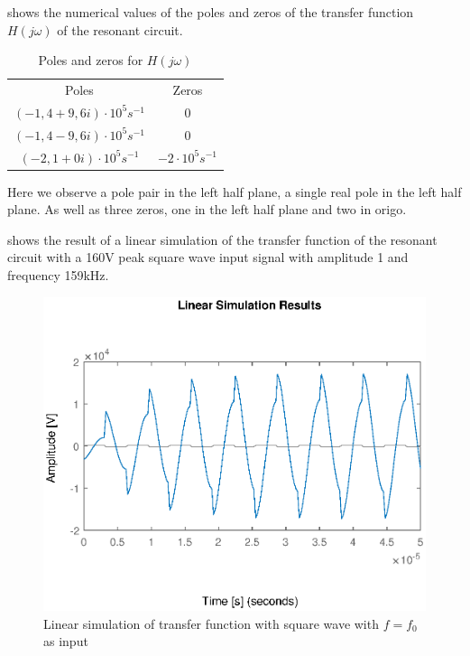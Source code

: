  shows the numerical values of the poles and zeros of the transfer function $H(j\omega)$ of the resonant circuit.

\begin{table}[h]
    \centering
    \begin{tabular}{c|c}
        Poles & Zeros \\
        $(-1,4 + 9,6i)\cdot 10^{5} s^{-1}$ & $0$ \\
        $(-1,4 - 9,6i)\cdot 10^{5} s^{-1}$ & $0$ \\
        $(-2,1 + 0i)\cdot 10^{5} s^{-1}$ & $-2\cdot 10^{5} s^{-1}$ \\
    \end{tabular}
    \caption{Poles and zeros for $H(j\omega)$}
    \label{tab:coilrigpoles}
\end{table}

Here we observe a pole pair in the left half plane, a single real pole in the left half plane. As well as three zeros, one in the left half plane and two in origo.

 shows the result of a linear simulation of the transfer function of the resonant circuit with a 160V peak square wave input signal with amplitude 1 and frequency 159kHz.

\begin{figure}[H]
    \centering
    \includegraphics[width=\textwidth]{img/CoilRigSimulation.eps}
    \caption{Linear simulation of transfer function with square wave with $f=f_0$ as input}
    \label{fig:crlinsim}
\end{figure}

